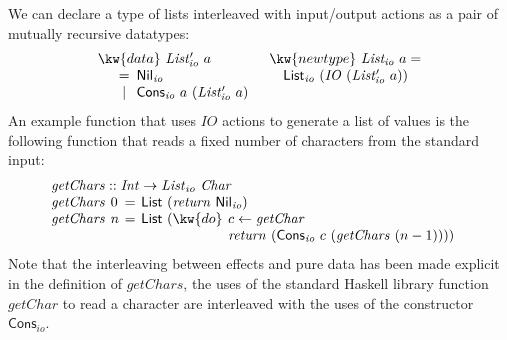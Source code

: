 We can declare a type of lists interleaved with input/output actions
as a pair of mutually recursive datatypes:
\begin{displaymath}
  \begin{array}{ll}
    \kw{data}~\mathit{List'_{io}}~a
    &
    \kw{newtype}~\mathit{List_{io}}~a = 
    \\
    \quad
    \begin{array}[t]{c@{\hspace{0.5em}}l}
      = & \mathsf{Nil}_{\mathit{io}} \\
      | & \mathsf{Cons}_{\mathit{io}}~a~(\mathit{List'_{io}}~a) \\
    \end{array}
    &
    \quad \mathsf{List}_{\mathit{io}}~(\mathit{IO}~(\mathit{List'_{io}}~a))
  \end{array}
\end{displaymath}
An example function that uses $\mathit{IO}$ actions to generate a list
of values is the following function that reads a fixed number of
characters from the standard input:
\begin{displaymath}
  \begin{array}{l}
    \mathit{getChars} :: \mathit{Int} \to \mathit{List}_{io}~\mathit{Char} \\
    \begin{array}{@{}l@{\hspace{0.4em}}l@{\hspace{0.4em}}c@{\hspace{0.4em}}l}
      \mathit{getChars} & 0 & = & \mathsf{List}~(\mathit{return}~\mathsf{Nil}_{\mathit{io}}) \\
      \mathit{getChars} & n & = & \mathsf{List}~(
      \begin{array}[t]{@{}l@{\hspace{0.4em}}l}
        \kw{do} & c \leftarrow \mathit{getChar} \\
        & \mathit{return}~(\mathsf{Cons}_{\mathit{io}}~c~(\mathit{getChars}~(n-1))))
      \end{array}
    \end{array}
  \end{array}
\end{displaymath}
Note that the interleaving between effects and pure data has been made
explicit in the definition of $\mathit{getChars}$, the uses of the
standard Haskell library function $\mathit{getChar}$ to read a
character are interleaved with the uses of the constructor
$\mathsf{Cons}_{\mathit{io}}$.

